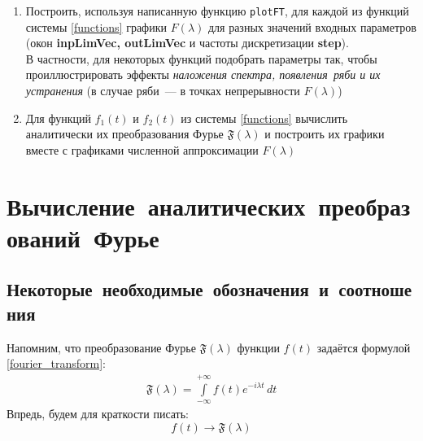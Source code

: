 \documentclass[11pt, oneside, final]{article} \sloppy
\numberwithin{equation}{section}
\newcommand \four[1][\lambda]{\mathfrak{F}(#1)}
\newcommand \fft[1][\lambda]{F(#1)}
\newcommand \rarrow{\rightarrow}
\newcommand \intinf[1][{\,dt}]{ \int\limits_{-\infty}^{+\infty}{{#1}}}
\begin{document}
\begin{enumerate}
    \item Построить, используя написанную функцию \texttt{plotFT}, для каждой из функций системы \eqref{functions} графики \(\fft\) для разных значений входных параметров (окон \textbf{inpLimVec, outLimVec} и частоты дискретизации \textbf{step}). \\В частности, для некоторых функций подобрать параметры так, чтобы проиллюстрировать эффекты \textit{наложения спектра, появления~ряби и их устранения} (в случае ряби~--- в точках непрерывности \(\fft\)) 
    \item Для функций \(f_1(t)\) и \(f_2(t)\) из системы \eqref{functions} вычислить аналитически их преобразования Фурье \(\four\) и построить их графики вместе с графиками численной аппроксимации \(\fft\) 
\end{enumerate}



\section{Вычисление~аналитических~преобразований~Фурье}

\subsection{Некоторые~необходимые~обозначения~и~соотношения} Напомним, что преобразование Фурье \( \four \) функции \(f(t)\) задаётся формулой \eqref{fourier_transform}: 
\begin{align*}
    \four = \intinf[ {f(t) e^{-i\lambda t}\, dt}] 
\end{align*}
Впредь, будем для краткости писать:
\[ \boxed{ f(t)\rarrow\four} \]
\end{document}
